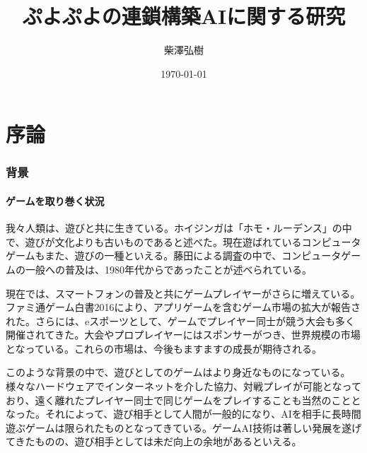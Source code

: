 \documentclass[12pt]{jsarticle}
\title{}
\date{\today}
\author{柴澤弘樹}
\title{ぷよぷよの連鎖構築AIに関する研究}
\begin{document}
\maketitle

\part{序論} \setcounter{section}{0}
\section{背景}
\subsection{ゲームを取り巻く状況}
我々人類は、遊びと共に生きている。ホイジンガは「ホモ・ルーデンス」の中で、遊びが文化よりも古いものであると述べた\cite{homo}。現在遊ばれているコンピュータゲームもまた、遊びの一種といえる。藤田による調査\cite{huzita1,huzita2,huzita3}の中で、コンピュータゲームの一般への普及は、1980年代からであったことが述べられている。

現在では、スマートフォンの普及と共にゲームプレイヤーがさらに増えている。ファミ通ゲーム白書2016\cite{famitu}により、アプリゲームを含むゲーム市場の拡大が報告された。さらには、eスポーツとして、ゲームでプレイヤー同士が競う大会も多く開催されてきた。大会やプロプレイヤーにはスポンサーがつき、世界規模の市場となっている\cite{e-sports}。これらの市場は、今後もますますの成長が期待される。

このような背景の中で、遊びとしてのゲームはより身近なものになっている。様々なハードウェアでインターネットを介した協力、対戦プレイが可能となっており、遠く離れたプレイヤー同士で同じゲームをプレイすることも当然のこととなった。それによって、遊び相手として人間が一般的になり、AIを相手に長時間遊ぶゲームは限られたものとなってきている。ゲームAI技術は著しい発展を遂げてきたものの、遊び相手としては未だ向上の余地があるといえる。
\end{document}
